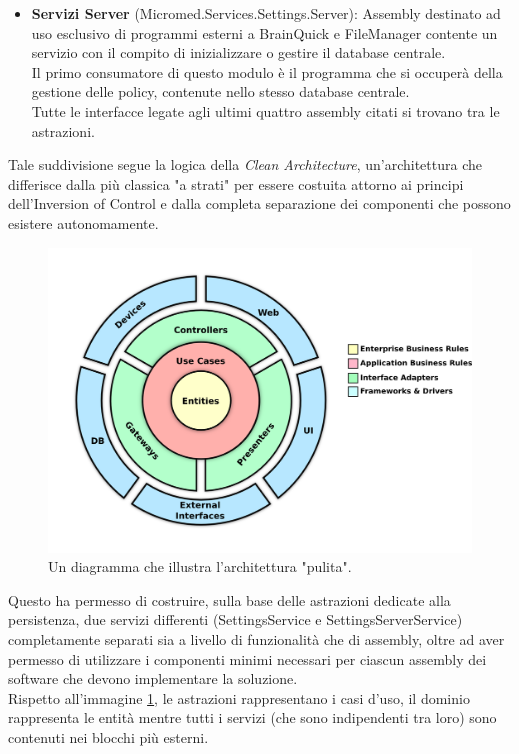 \documentclass[\main/tesi.tex]{subfiles}
\begin{document}
\begin{itemize}
    \item \textbf{Servizi Server} (Micromed.Services.Settings.Server): Assembly destinato ad uso esclusivo di programmi esterni a BrainQuick e FileManager contente un servizio con il compito di inizializzare o gestire il database centrale.\\Il primo consumatore di questo modulo è il programma che si occuperà della gestione delle policy, contenute nello stesso database centrale.\\
Tutte le interfacce legate agli ultimi quattro assembly citati si trovano tra le astrazioni.
\end{itemize}

Tale suddivisione segue la logica della \textit{Clean Architecture}, un'architettura che differisce dalla più classica "a strati" per essere costuita attorno ai principi dell'Inversion of Control e dalla completa separazione dei componenti che possono esistere autonomamente.\\

\begin{figure}[h]
    \label{fig:image_clean}
    \caption{Un diagramma che illustra l'architettura "pulita".}
    \includegraphics[width=\textwidth]{../images/clean.png}
\end{figure}

Questo ha permesso di costruire, sulla base delle astrazioni dedicate alla persistenza, due servizi differenti (SettingsService e SettingsServerService) completamente separati sia a livello di funzionalità che di assembly, oltre ad aver permesso di utilizzare i componenti minimi necessari per ciascun assembly dei software che devono implementare la soluzione.\\
Rispetto all'immagine \ref{fig:image_clean}, le astrazioni rappresentano i casi d'uso, il dominio rappresenta le entità mentre tutti i servizi (che sono indipendenti tra loro) sono contenuti nei blocchi più esterni.\\
\end{document}
